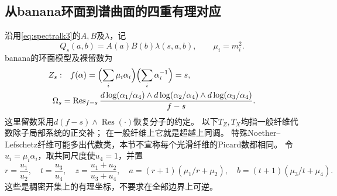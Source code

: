 \documentclass[11pt,a4paper]{ctexart}
\theoremstyle{cnplain}\newtheorem{theorem}{定理}[section]
\theoremstyle{definition}\newtheorem{definition}[theorem]{定义}
\theoremstyle{remark}\newtheorem{remark}[theorem]{注}
\begin{document}
\subsection{从banana环面到谱曲面的四重有理对应}
沿用\eqref{eq:spectralk3}的$A,B$及$\lambda$，记
\[
 Q_s(a,b)=A(a)B(b)\lambda(s,a,b),\qquad \mu_i=m_i^2.
\]
banana的环面模型及裸留数为
\begin{align}
 Z_s:&\quad f(\alpha)=\Bigl(\sum_i\mu_i\alpha_i\Bigr)
                 \Bigl(\sum_i\alpha_i^{-1}\Bigr)=s,\label{eq:evenztorus}\\
 \Omega_s&=\operatorname{Res}_{f=s}
 \frac{d\log(\alpha_1/\alpha_4)\wedge d\log(\alpha_2/\alpha_4)
                  \wedge d\log(\alpha_3/\alpha_4)}{f-s}.
 \label{eq:evenzres}
\end{align}
这里留数采用$d(f-s)\wedge\operatorname{Res}(\cdot)$恢复分子的约定。
以下$T_Z,T_X$均指一般纤维代数除子局部系统的正交补；
在一般纤维上它就是超越上同调。
特殊Noether--Lefschetz纤维可能多出代数类，本节不宣称每个光滑纤维的Picard数都相同。
令$u_i=\mu_i\alpha_i$，取共同尺度使$u_4=1$，并置
\[
 r=\frac{u_1}{u_2},\quad t=\frac{u_3}{u_4},\quad
 z=\frac{u_1+u_2}{u_3+u_4},\quad
 a=(r+1)(\mu_1/r+\mu_2),\quad b=(t+1)(\mu_3/t+\mu_4).
\]
这些是稠密开集上的有理坐标，不要求在全部边界上可逆。
\end{document}
